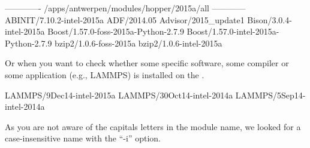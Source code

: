 \begin{prompt}
------------- /apps/antwerpen/modules/hopper/2015a/all ------------
ABINIT/7.10.2-intel-2015a
ADF/2014.05
Advisor/2015_update1
Bison/3.0.4-intel-2015a
Boost/1.57.0-foss-2015a-Python-2.7.9
Boost/1.57.0-intel-2015a-Python-2.7.9
bzip2/1.0.6-foss-2015a
bzip2/1.0.6-intel-2015a
\end{prompt}

Or when you want to check whether some specific software, some compiler or some
application (e.g., LAMMPS) is installed on the \hpc.

\begin{prompt}
LAMMPS/9Dec14-intel-2015a
LAMMPS/30Oct14-intel-2014a
LAMMPS/5Sep14-intel-2014a
\end{prompt}

As you are not aware of the capitals letters in the module name, we looked for
a case-insensitive name with the ``-i'' option.
